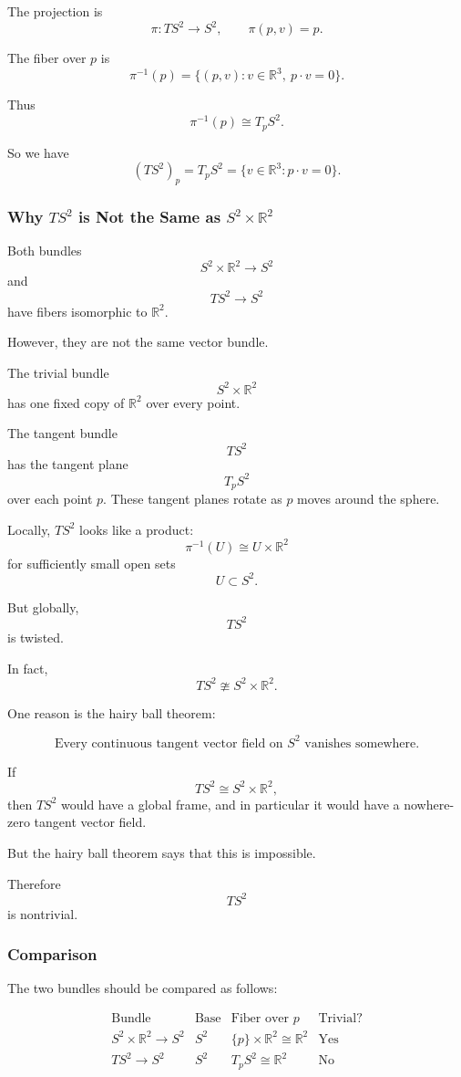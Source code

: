 \documentclass[12pt,a4paper]{article}
\theoremstyle{notespace}
\begin{document}
The projection is
\[
\pi:TS^2\longrightarrow S^2,
\qquad
\pi(p,v)=p.
\]

The fiber over \(p\) is
\[
\pi^{-1}(p)
=
\{(p,v):v\in \mathbb R^3,\ p\cdot v=0\}.
\]

Thus
\[
\pi^{-1}(p)\cong T_pS^2.
\]

So we have
\[
\boxed{
	(TS^2)_p=T_pS^2
	=
	\{v\in \mathbb R^3:p\cdot v=0\}.
}
\]

\subsubsection{Why \(TS^2\) is Not the Same as \(S^2\times \mathbb R^2\)}

Both bundles
\[
S^2\times \mathbb R^2\to S^2
\]
and
\[
TS^2\to S^2
\]
have fibers isomorphic to \(\mathbb R^2\).

However, they are not the same vector bundle.

The trivial bundle
\[
S^2\times \mathbb R^2
\]
has one fixed copy of \(\mathbb R^2\) over every point.

The tangent bundle
\[
TS^2
\]
has the tangent plane
\[
T_pS^2
\]
over each point \(p\). These tangent planes rotate as \(p\) moves around the sphere.

Locally, \(TS^2\) looks like a product:
\[
\pi^{-1}(U)\cong U\times \mathbb R^2
\]
for sufficiently small open sets
\[
U\subset S^2.
\]

But globally,
\[
TS^2
\]
is twisted.

In fact,
\[
\boxed{
	TS^2\ncong S^2\times \mathbb R^2.
}
\]

One reason is the hairy ball theorem:

\[
\boxed{
	\text{Every continuous tangent vector field on }S^2
	\text{ vanishes somewhere.}
}
\]

If
\[
TS^2\cong S^2\times \mathbb R^2,
\]
then \(TS^2\) would have a global frame, and in particular it would have a nowhere-zero tangent vector field.

But the hairy ball theorem says that this is impossible.

Therefore
\[
TS^2
\]
is nontrivial.

\subsubsection{Comparison}

The two bundles should be compared as follows:

\[
\begin{array}{c|c|c|c}
	\text{Bundle} & \text{Base} & \text{Fiber over }p & \text{Trivial?} \\
	\hline
	S^2\times \mathbb R^2\to S^2
	&
	S^2
	&
	\{p\}\times \mathbb R^2\cong \mathbb R^2
	&
	\text{Yes}
	\\
	TS^2\to S^2
	&
	S^2
	&
	T_pS^2\cong \mathbb R^2
	&
	\text{No}
\end{array}
\]
\end{document}
